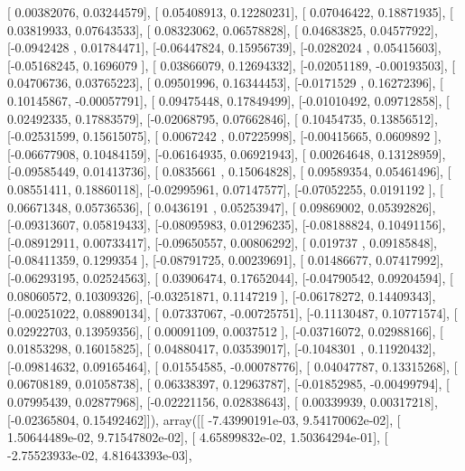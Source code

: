 \documentclass{article}
\begin{document}
       [ 0.00382076,  0.03244579],
       [ 0.05408913,  0.12280231],
       [ 0.07046422,  0.18871935],
       [ 0.03819933,  0.07643533],
       [ 0.08323062,  0.06578828],
       [ 0.04683825,  0.04577922],
       [-0.0942428 ,  0.01784471],
       [-0.06447824,  0.15956739],
       [-0.0282024 ,  0.05415603],
       [-0.05168245,  0.1696079 ],
       [ 0.03866079,  0.12694332],
       [-0.02051189, -0.00193503],
       [ 0.04706736,  0.03765223],
       [ 0.09501996,  0.16344453],
       [-0.0171529 ,  0.16272396],
       [ 0.10145867, -0.00057791],
       [ 0.09475448,  0.17849499],
       [-0.01010492,  0.09712858],
       [ 0.02492335,  0.17883579],
       [-0.02068795,  0.07662846],
       [ 0.10454735,  0.13856512],
       [-0.02531599,  0.15615075],
       [ 0.0067242 ,  0.07225998],
       [-0.00415665,  0.0609892 ],
       [-0.06677908,  0.10484159],
       [-0.06164935,  0.06921943],
       [ 0.00264648,  0.13128959],
       [-0.09585449,  0.01413736],
       [ 0.0835661 ,  0.15064828],
       [ 0.09589354,  0.05461496],
       [ 0.08551411,  0.18860118],
       [-0.02995961,  0.07147577],
       [-0.07052255,  0.0191192 ],
       [ 0.06671348,  0.05736536],
       [ 0.0436191 ,  0.05253947],
       [ 0.09869002,  0.05392826],
       [-0.09313607,  0.05819433],
       [-0.08095983,  0.01296235],
       [-0.08188824,  0.10491156],
       [-0.08912911,  0.00733417],
       [-0.09650557,  0.00806292],
       [ 0.019737  ,  0.09185848],
       [-0.08411359,  0.1299354 ],
       [-0.08791725,  0.00239691],
       [ 0.01486677,  0.07417992],
       [-0.06293195,  0.02524563],
       [ 0.03906474,  0.17652044],
       [-0.04790542,  0.09204594],
       [ 0.08060572,  0.10309326],
       [-0.03251871,  0.1147219 ],
       [-0.06178272,  0.14409343],
       [-0.00251022,  0.08890134],
       [ 0.07337067, -0.00725751],
       [-0.11130487,  0.10771574],
       [ 0.02922703,  0.13959356],
       [ 0.00091109,  0.0037512 ],
       [-0.03716072,  0.02988166],
       [ 0.01853298,  0.16015825],
       [ 0.04880417,  0.03539017],
       [-0.1048301 ,  0.11920432],
       [-0.09814632,  0.09165464],
       [ 0.01554585, -0.00078776],
       [ 0.04047787,  0.13315268],
       [ 0.06708189,  0.01058738],
       [ 0.06338397,  0.12963787],
       [-0.01852985, -0.00499794],
       [ 0.07995439,  0.02877968],
       [-0.02221156,  0.02838643],
       [ 0.00339939,  0.00317218],
       [-0.02365804,  0.15492462]]), array([[ -7.43990191e-03,   9.54170062e-02],
       [  1.50644489e-02,   9.71547802e-02],
       [  4.65899832e-02,   1.50364294e-01],
       [ -2.75523933e-02,   4.81643393e-03],
\end{document}
